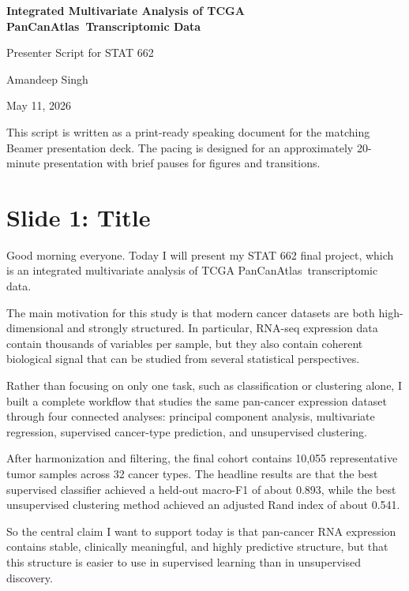 \documentclass[12pt]{article}
\newcommand{\tcga}{TCGA PanCanAtlas}
\begin{document}
\begin{center}
{\LARGE\bfseries Integrated Multivariate Analysis of \tcga\ Transcriptomic Data\par}
\vspace{0.25cm}
{\large Presenter Script for STAT 662\par}
\vspace{0.2cm}
{\normalsize Amandeep Singh\par}
\vspace{0.2cm}
{\small May 11, 2026\par}
\end{center}

\vspace{0.35cm}

{\small\color{SpeechGray}
This script is written as a print-ready speaking document for the matching Beamer presentation deck. The pacing is designed for an approximately 20-minute presentation with brief pauses for figures and transitions.
\par}

\section{Slide 1: Title}
Good morning everyone. Today I will present my STAT 662 final project, which is an integrated multivariate analysis of \tcga\ transcriptomic data.

The main motivation for this study is that modern cancer datasets are both high-dimensional and strongly structured. In particular, RNA-seq expression data contain thousands of variables per sample, but they also contain coherent biological signal that can be studied from several statistical perspectives.

Rather than focusing on only one task, such as classification or clustering alone, I built a complete workflow that studies the same pan-cancer expression dataset through four connected analyses: principal component analysis, multivariate regression, supervised cancer-type prediction, and unsupervised clustering.

After harmonization and filtering, the final cohort contains 10,055 representative tumor samples across 32 cancer types. The headline results are that the best supervised classifier achieved a held-out macro-F1 of about 0.893, while the best unsupervised clustering method achieved an adjusted Rand index of about 0.541.

So the central claim I want to support today is that pan-cancer RNA expression contains stable, clinically meaningful, and highly predictive structure, but that this structure is easier to use in supervised learning than in unsupervised discovery.
\end{document}
